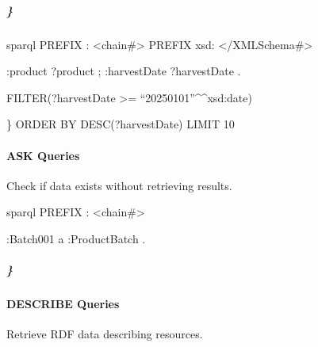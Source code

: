 \documentclass[letterpaper,10pt,english]{sphinxmanual}
\begin{document}
\subparagraph{\}}
\label{\detokenize{api/sparql-api:id5}}
\sphinxAtStartPar
{}
{\color{red}\bfseries{}\textasciigrave{}\textasciigrave{}}{\color{red}\bfseries{}\textasciigrave{}}sparql
PREFIX : \textless{}\sphinxhyphen{}chain\#\textgreater{}
PREFIX xsd: \textless{}/XMLSchema\#\textgreater{}
\begin{description}
\begin{description}
\sphinxAtStartPar
:product ?product ;
:harvestDate ?harvestDate .

\end{description}

\sphinxAtStartPar
FILTER(?harvestDate \textgreater{}= “2025\sphinxhyphen{}01\sphinxhyphen{}01”\textasciicircum{}\textasciicircum{}xsd:date)

\end{description}

\sphinxAtStartPar
\}
ORDER BY DESC(?harvestDate)
LIMIT 10
{\color{red}\bfseries{}\textasciigrave{}\textasciigrave{}}{\color{red}\bfseries{}\textasciigrave{}}


\paragraph{ASK Queries}
\label{\detokenize{api/sparql-api:ask-queries}}
\sphinxAtStartPar
Check if data exists without retrieving results.

\sphinxAtStartPar
{}
{\color{red}\bfseries{}\textasciigrave{}\textasciigrave{}}{\color{red}\bfseries{}\textasciigrave{}}sparql
PREFIX : \textless{}\sphinxhyphen{}chain\#\textgreater{}
\begin{description}
\sphinxAtStartPar
:Batch001 a :ProductBatch .

\end{description}


\subparagraph{\}}
\label{\detokenize{api/sparql-api:id18}}

\paragraph{DESCRIBE Queries}
\label{\detokenize{api/sparql-api:describe-queries}}
\sphinxAtStartPar
Retrieve RDF data describing resources.
\end{document}
